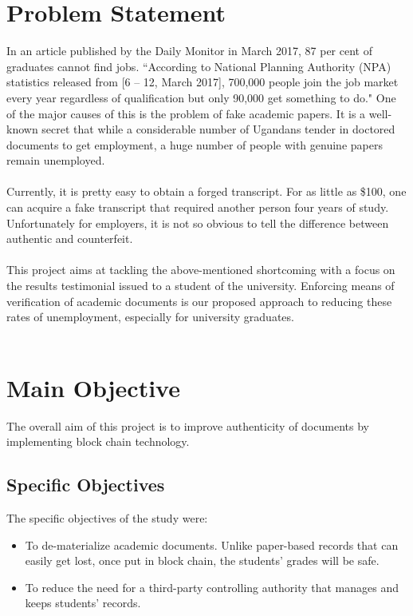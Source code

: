 \section{Problem Statement}
In an article published by the Daily Monitor in March 2017, 87 per cent of graduates cannot find jobs. ``According to National Planning Authority (NPA) statistics released from [6 – 12, March 2017], 700,000 people join the job market every year regardless of qualification but only 90,000 get something to do."\cite{art11} 
One of the major causes of this is the problem of fake academic papers. It is a well-known secret that while a considerable number of Ugandans tender in doctored documents to get employment, a huge number of people with
genuine papers remain unemployed.\\\\
Currently, it is pretty easy to obtain a forged transcript. For as little as \$100, one can acquire a fake transcript that required another person four years of study. Unfortunately for employers, it is not so obvious to tell the difference between authentic and counterfeit.\\\\
This project aims at tackling the above-mentioned shortcoming with a focus on the results testimonial issued to a student of the university. Enforcing means of verification of academic documents is our proposed approach to reducing these rates of unemployment, especially for university graduates.\\\\

\section{Main Objective}
The overall aim of this project is to improve authenticity of documents by implementing block chain technology.
\subsection{Specific Objectives}
The specific objectives of the study were: 
\begin{itemize}
\item To de-materialize academic documents. Unlike paper-based records that can easily get lost, once put in block chain, the students' grades will be safe.
\item To reduce the need for a third-party controlling authority that manages and keeps students' records.
\end{itemize}
